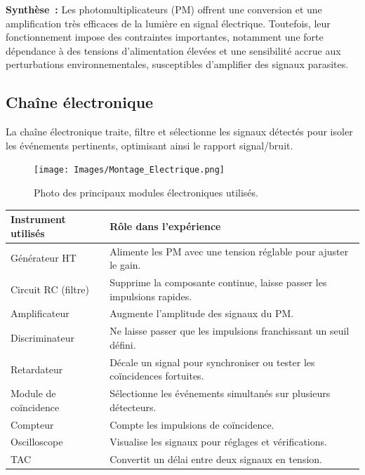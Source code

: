 \documentclass[a4paper,12pt,twoside]{article}
\begin{document}
\begin{remarque}
\textbf{Synthèse~:} Les photomultiplicateurs (PM) offrent une conversion et une amplification très efficaces de la lumière en signal électrique. Toutefois, leur fonctionnement impose des contraintes importantes, notamment une forte dépendance à des tensions d’alimentation élevées et une sensibilité accrue aux perturbations environnementales, susceptibles d’amplifier des signaux parasites.
\end{remarque}


\subsection{Chaîne électronique}


\vspace{1em}
\begin{center}
\begin{tcolorbox}[colback=blue!5!white, colframe=blue!60!black, title=Principe de la chaîne électronique]
La chaîne électronique traite, filtre et sélectionne les signaux détectés pour isoler les événements pertinents, optimisant ainsi le rapport signal/bruit.
\end{tcolorbox}
\end{center}

\begin{figure}[H]
  \centering
  \texttt{[image: Images/Montage\_Electrique.png]}
  \caption{Photo des principaux modules électroniques utilisés.}
  \label{fig:photo_instruments}
\end{figure}


\begin{center}
\begin{tabular}{|l|p{12cm}|}
\hline
\textbf{Instrument utilisés} & \textbf{Rôle dans l’expérience} \\
\hline
Générateur HT & Alimente les PM avec une tension réglable pour ajuster le gain. \\
\hline
Circuit RC (filtre) & Supprime la composante continue, laisse passer les impulsions rapides. \\
\hline
Amplificateur & Augmente l’amplitude des signaux du PM. \\
\hline
Discriminateur & Ne laisse passer que les impulsions franchissant un seuil défini. \\
\hline
Retardateur & Décale un signal pour synchroniser ou tester les coïncidences fortuites. \\
\hline
Module de coïncidence & Sélectionne les événements simultanés sur plusieurs détecteurs. \\
\hline
Compteur & Compte les impulsions de coïncidence. \\
\hline
Oscilloscope & Visualise les signaux pour réglages et vérifications. \\
\hline
TAC & Convertit un délai entre deux signaux en tension. \\
\hline
\end{tabular}
\end{center}
\end{document}
